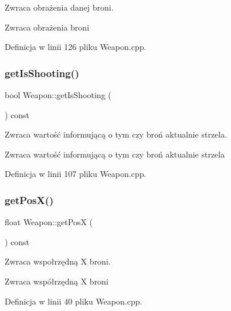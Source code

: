 Zwraca obrażenia danej broni. 

\begin{DoxyReturn}{Zwraca}
obrażenia broni 
\end{DoxyReturn}


Definicja w linii 126 pliku Weapon.\+cpp.

\mbox{\label{class_weapon_a71c1102f1e752307efbb83c7140bca66}} 
\subsubsection{\texorpdfstring{get\+Is\+Shooting()}{getIsShooting()}}
{\footnotesize\ttfamily bool Weapon\+::get\+Is\+Shooting (\begin{DoxyParamCaption}{ }\end{DoxyParamCaption}) const}



Zwraca wartość informującą o tym czy broń aktualnie strzela. 

\begin{DoxyReturn}{Zwraca}
wartość informującą o tym czy broń aktualnie strzela 
\end{DoxyReturn}


Definicja w linii 107 pliku Weapon.\+cpp.

\mbox{\label{class_weapon_ac46e15594ab133d8bd9484f31675c087}} 
\subsubsection{\texorpdfstring{get\+Pos\+X()}{getPosX()}}
{\footnotesize\ttfamily float Weapon\+::get\+PosX (\begin{DoxyParamCaption}{ }\end{DoxyParamCaption}) const}



Zwraca wspołrzędną X broni. 

\begin{DoxyReturn}{Zwraca}
współrzędną X broni 
\end{DoxyReturn}


Definicja w linii 40 pliku Weapon.\+cpp.

\mbox{\label{class_weapon_a725696ea526b49b35b4219fdd7faa68e}} 
